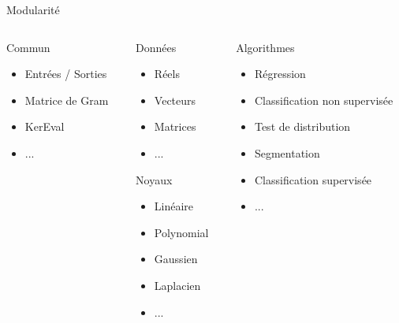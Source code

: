 \documentclass{beamer}
\begin{document}
\begin{frame}{Modularité} %
	\begin{columns}
		\begin{column}{0.3\textwidth}
			\begin{block}{Commun}
				\begin{itemize}
					\item Entrées / Sorties
					\item Matrice de Gram
					\item KerEval
					\item ...
				\end{itemize}
			\end{block}
		\end{column}
		\begin{column}{0.3\textwidth}
			\begin{block}{Données}
				\begin{itemize}
					\item Réels
					\item Vecteurs
					\item Matrices
					\item ...
				\end{itemize}
			\end{block}
			\begin{block}{Noyaux}
				\begin{itemize}
					\item Linéaire
					\item Polynomial
					\item Gaussien
					\item Laplacien
					\item ...
				\end{itemize}
			\end{block}
		\end{column}
		\begin{column}{0.3\textwidth}
			\begin{block}{Algorithmes}
				\begin{itemize}
					\item Régression
					\item Classification non supervisée
					\item Test de distribution
					\item Segmentation
					\item Classification supervisée
					\item ...
				\end{itemize}
			\end{block}
		\end{column}
	\end{columns}
\end{frame}
\end{document}

